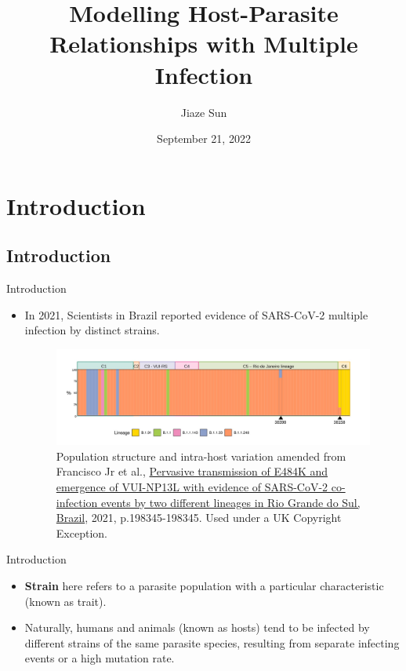 \documentclass{beamer}
\title[\textcolor{white}{Supervisor: Megan Oliver}]{Modelling Host-Parasite Relationships with Multiple Infection}
\author{Jiaze Sun}
\date{September 21, 2022}
\begin{document}
	
	\begin{frame}
		\titlepage
	\end{frame}
	
	\section{Introduction}
	\subsection{Introduction}
	\begin{frame}{Introduction}
		\begin{itemize}
			\item In 2021, Scientists in Brazil reported evidence of SARS-CoV-2 multiple infection by distinct strains.
		\begin{figure}[ht]
			\label{Figure 1}
			\begin{center}
				\includegraphics[width=330pt]{"Co-infection_of_Different_Covid_Lineages.jpg"}
			\end{center}
			\caption{\tiny Population structure and intra-host variation amended from Francisco Jr et al., \href{https://doi.org/10.1016/j.virusres.2021.198345}{Pervasive transmission of E484K and emergence of VUI-NP13L with evidence of SARS-CoV-2 co-infection events by two different lineages in Rio Grande do Sul, Brazil}, 2021, p.198345-198345. Used under a UK Copyright Exception.}
		\end{figure}
		\end{itemize}
	\end{frame}

	\begin{frame}{Introduction}
		\begin{itemize}
			\item \textbf{Strain} here refers to a parasite population with a particular characteristic (known as trait).
			\vspace{1em}
			\item Naturally, humans and animals (known as hosts) tend to be infected by different strains of the same parasite species, resulting from separate infecting events or a high mutation rate. 
		\end{itemize}
	\end{frame}
	
\end{document}
